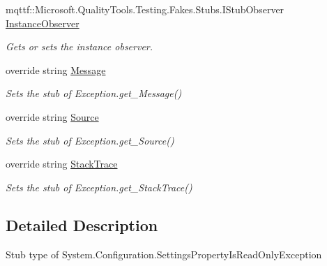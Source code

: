 \begin{DoxyCompactItemize}
mqttf\-::\-Microsoft.\-Quality\-Tools.\-Testing.\-Fakes.\-Stubs.\-I\-Stub\-Observer \hyperlink{class_system_1_1_configuration_1_1_fakes_1_1_stub_settings_property_is_read_only_exception_ae24b02f9e3e30155fc4250c42bab0afe}{Instance\-Observer}
\begin{DoxyCompactList}\small\item\em Gets or sets the instance observer.\end{DoxyCompactList}\item 
override string \hyperlink{class_system_1_1_configuration_1_1_fakes_1_1_stub_settings_property_is_read_only_exception_a15e9037716a5f3c0329100a9ea4e6faf}{Message}
\begin{DoxyCompactList}\small\item\em Sets the stub of Exception.\-get\-\_\-\-Message()\end{DoxyCompactList}\item 
override string \hyperlink{class_system_1_1_configuration_1_1_fakes_1_1_stub_settings_property_is_read_only_exception_abf075821e211dd3cb217412f07464a6a}{Source}
\begin{DoxyCompactList}\small\item\em Sets the stub of Exception.\-get\-\_\-\-Source()\end{DoxyCompactList}\item 
override string \hyperlink{class_system_1_1_configuration_1_1_fakes_1_1_stub_settings_property_is_read_only_exception_a99aacc5d847cc66ea15bfb6170ab961e}{Stack\-Trace}
\begin{DoxyCompactList}\small\item\em Sets the stub of Exception.\-get\-\_\-\-Stack\-Trace()\end{DoxyCompactList}\end{DoxyCompactItemize}


\subsection{Detailed Description}
Stub type of System.\-Configuration.\-Settings\-Property\-Is\-Read\-Only\-Exception



